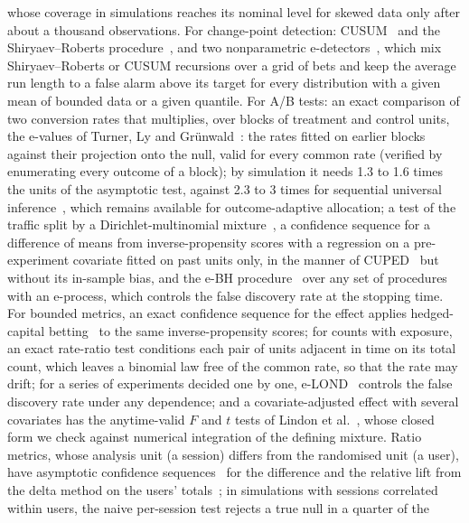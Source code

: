 \documentclass[11pt,a4paper]{article}
\theoremstyle{definition}
\theoremstyle{remark}
\begin{document}
whose coverage in simulations reaches its nominal level for skewed data
only after about a thousand observations. For change-point
detection: CUSUM~\cite{page1954} and the Shiryaev--Roberts
procedure~\cite{shiryaev1963,roberts1966,pollak1985}, and two nonparametric
e-detectors~\cite{shin2024edetectors}, which mix Shiryaev--Roberts or CUSUM
recursions over a grid of bets and keep the average run length to a false
alarm above its target for every distribution with a given mean of bounded
data or a given quantile. For A/B tests: an exact comparison of two
conversion rates that multiplies, over blocks of treatment and control
units, the e-values of Turner, Ly and Gr\"unwald~\cite{turner2024}: the
rates fitted on earlier blocks against their projection onto the null,
valid for every common rate (verified by enumerating every outcome of a
block); by simulation it needs 1.3 to 1.6 times the units of the
asymptotic test, against 2.3 to 3 times for sequential universal
inference~\cite{wasserman2020}, which remains available for
outcome-adaptive allocation; a test of the traffic split by a Dirichlet-multinomial
mixture~\cite{lindon2022}, a confidence sequence for a difference of
means from inverse-propensity scores with a regression on a
pre-experiment covariate fitted on past units only, in the manner of
CUPED~\cite{deng2013} but without its in-sample bias, and the e-BH
procedure~\cite{wang2022ebh} over any set of procedures with an
e-process, which controls the false discovery rate at the stopping time. For bounded metrics, an exact
confidence sequence for the effect applies hedged-capital
betting~\cite{waudbysmith2024} to the same inverse-propensity scores;
for counts with exposure, an exact rate-ratio test conditions each pair
of units adjacent in time on its total count, which leaves a binomial
law free of the common rate, so that the rate may drift; for a series of
experiments decided one by one, e-LOND~\cite{xu2024online} controls the
false discovery rate under any dependence; and a covariate-adjusted
effect with several covariates has the anytime-valid $F$ and $t$ tests of
Lindon et al.~\cite{lindon2022linear}, whose closed form we check against
numerical integration of the defining mixture. Ratio metrics, whose
analysis unit (a session) differs from the randomised unit (a user), have
asymptotic confidence sequences~\cite{waudbysmith2024asymptotic} for the
difference and the relative lift from the delta method on the users'
totals~\cite{deng2013}; in simulations with sessions correlated within
users, the naive per-session test rejects a true null in a quarter of the
\end{document}
